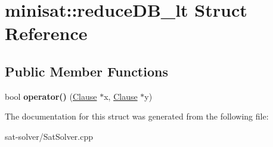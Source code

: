 \hypertarget{structminisat_1_1reduceDB__lt}{\section{minisat\-:\-:reduce\-D\-B\-\_\-lt \-Struct \-Reference}
\label{structminisat_1_1reduceDB__lt}
}
\subsection*{\-Public \-Member \-Functions}
\begin{DoxyCompactItemize}
\item 
\hypertarget{structminisat_1_1reduceDB__lt_a018f075d163f3bb1885f3f35d4cd826f}{bool {\bfseries operator()} (\hyperlink{classminisat_1_1Clause}{\-Clause} $\ast$x, \hyperlink{classminisat_1_1Clause}{\-Clause} $\ast$y)}\label{structminisat_1_1reduceDB__lt_a018f075d163f3bb1885f3f35d4cd826f}

\end{DoxyCompactItemize}


\-The documentation for this struct was generated from the following file\-:\begin{DoxyCompactItemize}
\item 
sat-\/solver/\-Sat\-Solver.\-cpp\end{DoxyCompactItemize}
